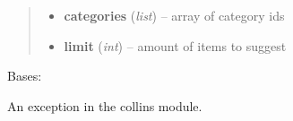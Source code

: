 \documentclass[letterpaper,10pt,english]{sphinxmanual}
\begin{document}
\begin{fulllineitems}
\begin{fulllineitems}
\begin{quote}
\begin{description}
\begin{itemize}
\item {} 
\textbf{categories} (\emph{list}) -- array of category ids

\item {} 
\textbf{limit} (\emph{int}) -- amount of items to suggest

\end{itemize}

\end{description}\end{quote}

\end{fulllineitems}


\end{fulllineitems}


\begin{fulllineitems}
\label{collins:collins.CollinsException}
Bases: 

An exception in the collins module.

\end{fulllineitems}

\end{document}
